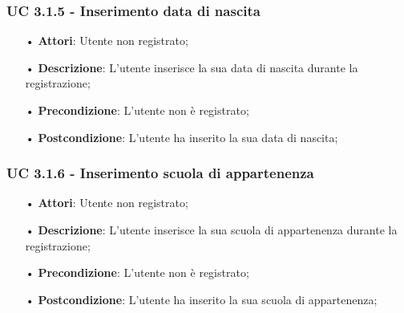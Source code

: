 \subsubsection{UC 3.1.5 - Inserimento data di nascita}
\begin{itemize}
\item[•]\textbf{Attori}: Utente non registrato;
\item[•]\textbf{Descrizione}: L’utente inserisce la sua data di nascita durante la registrazione;
\item[•]\textbf{Precondizione}: L’utente non è registrato;
\item[•]\textbf{Postcondizione}: L’utente ha inserito la sua data di nascita;
\end{itemize}

\subsubsection{UC 3.1.6 - Inserimento scuola di appartenenza}
\begin{itemize}
\item[•]\textbf{Attori}: Utente non registrato;
\item[•]\textbf{Descrizione}: L’utente inserisce la sua scuola di appartenenza durante la registrazione;
\item[•]\textbf{Precondizione}: L’utente non è registrato;
\item[•]\textbf{Postcondizione}: L’utente ha inserito la sua scuola di appartenenza;
\end{itemize}

